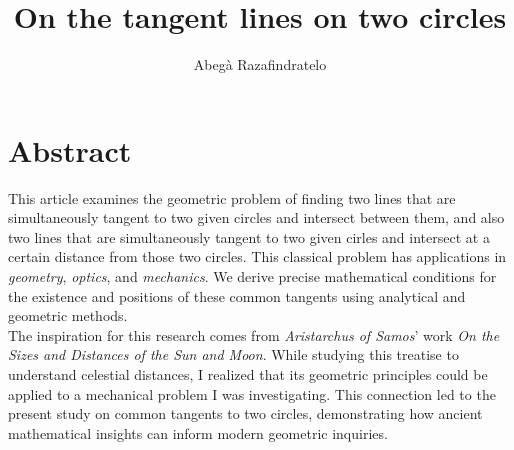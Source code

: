 \documentclass{article}
\author{Abegà Razafindratelo}
\title{On the tangent lines on two circles}
\begin{document}
\maketitle

\section*{Abstract}
This article examines the geometric problem of finding two lines that are simultaneously tangent to two given circles and intersect between them, and also two lines that are simultaneously tangent to two given cirles and intersect at a certain distance from those two circles. This classical problem has applications in \textit{geometry}, \textit{optics}, and \textit{mechanics}. We derive precise mathematical conditions for the existence and positions of these common tangents using analytical and geometric methods.\\

The inspiration for this research comes from \textit{Aristarchus of Samos}' work \textit{On the Sizes and Distances of the Sun and Moon}\cite{Aristarchus1572}. While studying this treatise to understand celestial distances, I realized that its geometric principles could be applied to a mechanical problem I was investigating. This connection led to the present study on common tangents to two circles, demonstrating how ancient mathematical insights can inform modern geometric inquiries.






\end{document}
